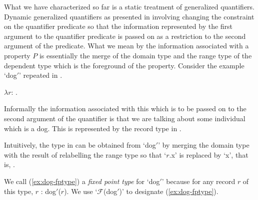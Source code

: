 What we have characterized so far is a static treatment of generalized
quantifiers.  Dynamic generalized quantifiers as presented in
\cite{Cooper2011} involving changing the
constraint on the quantifier predicate so that the information
represented by the first argument to the quantifier predicate is passed on as a
restriction to the second argument of the predicate.  What we mean by
the information associated with a property $P$ is essentially the
merge of the domain type and the range type of the dependent type
which is the foreground of the property.  Consider the example
`dog$'$' repeated in \nexteg{}.
\begin{ex} 
$\lambda r$: .  
\end{ex} 
Informally the information associated with this which is to be passed
on to the second argument of the quantifier is that we are talking
about some individual which is a dog.  This is represented by the
record type in \nexteg{}.
\begin{ex} 
  \label{ex:dog-fptype}
\end{ex} 
Intuitively, the type in \preveg{} can be obtained from `dog$'$' by
merging the domain type with the result of relabelling the range type
so that `$r$.x' is replaced by `x', that is, \nexteg{}.
\begin{ex} 
\end{ex} 
We call (\ref{ex:dog-fptype}) a \textit{fixed point type} for `dog$'$'
because for any record $r$ of this type, $r$ : dog$'$($r$).  We use
`$\mathcal{F}$(dog$'$)' to designate (\ref{ex:dog-fptype}).
